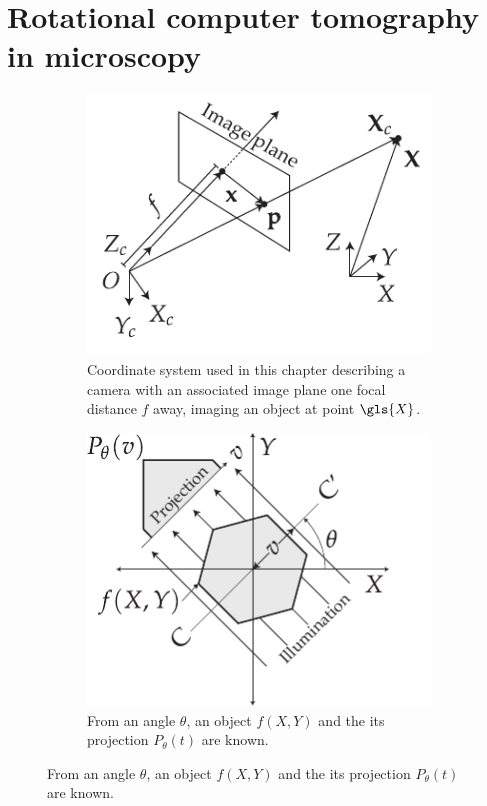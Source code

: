 
\pagebreak

\section{Rotational computer tomography in microscopy}

\begin{figure}
    \centering
    \begin{subfigure}[t]{0.475\textwidth}
        \centering
        \includegraphics{coordinate_system}
        \caption[Coordinate system]{Coordinate system used in this chapter describing a camera with an associated \gls{image plane} one focal distance \(f\) away, imaging an object at point \(\gls{X}\).
        }
        \label{fig:coordinate_system_flopt}
    \end{subfigure}\hfill
    \begin{subfigure}[t]{0.475\textwidth}
      \centering
      \includegraphics{Chapters/flopt/Figs/PDF/OPT_digram}
      \caption[Principle of OPT]{From an angle \(\theta\), an object \(f(X,Y)\) and the its projection \(P_\theta(t)\) are known.}

\end{subfigure}
\end{figure}

